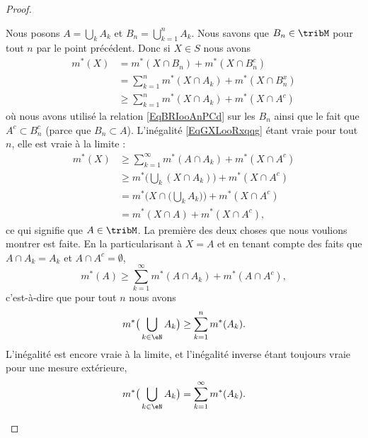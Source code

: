 \begin{proof}
\begin{subproof}
        Nous posons \( A=\bigcup_kA_k\) et \( B_n=\bigcup_{k=1}^nA_k\). Nous savons que \( B_n\in\tribM\) pour tout \( n\) par le point précédent. Donc si \( X\in S\) nous avons
        \begin{subequations}
            \begin{align}   \label{EqGXLooRxqqg}
                m^*(X)&=m^*(X\cap B_n)+m^*(X\cap B_n^c)\\
                &=\sum_{k=1}^nm^*(X\cap A_k)+m^*(X\cap B_n^x)\\
                &\geq\sum_{k=1}^nm^*(X\cap A_k)+m^*(X\cap A^c)
            \end{align}
        \end{subequations}
        où nous avons utilisé la relation \eqref{EqBRIooAnPCd} sur les \( B_n\) ainsi que le fait que \( A^c\subset B_n^c\) (parce que \( B_n\subset A\)). L'inégalité \eqref{EqGXLooRxqqg} étant vraie pour tout \( n\), elle est vraie à la limite :
        \begin{subequations}
            \begin{align}
                m^*(X)&\geq \sum_{k=1}^{\infty}m^*(A\cap A_k)+m^*(X\cap A^c)\\
                &\geq m^*\Big( \bigcup_k(X\cap A_k) \Big)+m^*(X\cap A^c)\\
                &=m^*\Big( X\cap \big( \bigcup_kA_k \big) \Big)+m^*(X\cap A^c)\\
                &=m^*(X\cap A)+m^*(X\cap A^c),
            \end{align}
        \end{subequations}
        ce qui signifie que \( A\in\tribM\). La première des deux choses que nous voulions montrer est faite. En la particularisant à \( X=A\) et en tenant compte des faits que \( A\cap A_k=A_k\) et \( A\cap A^c=\emptyset\),
        \begin{equation}
            m^*(A)\geq \sum_{k=1}^{\infty}m^*(A\cap A_k)+m^*(A\cap A^c),
        \end{equation}
        c'est-à-dire que pour tout \( n\) nous avons
        \begin{equation}
            m^*\big( \bigcup_{k\in \eN}A_k \big)\geq \sum_{k=1}^nm^*(A_k).
        \end{equation}
        L'inégalité est encore vraie à la limite, et l'inégalité inverse étant toujours vraie pour une mesure extérieure,
        \begin{equation}
            m^*\big( \bigcup_{k\in \eN}A_k \big)=\sum_{k=1}^{\infty}m^*(A_k).
        \end{equation}


\end{subproof}
\end{proof}
